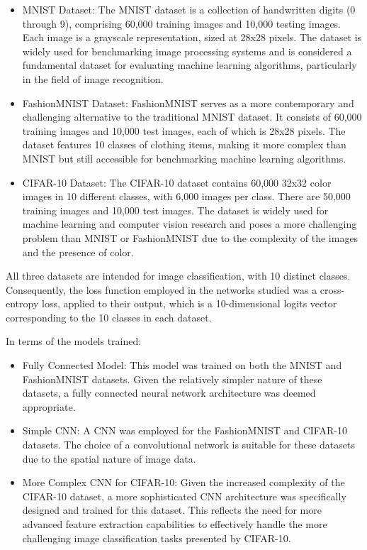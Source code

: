 \begin{itemize}

\item MNIST Dataset: The MNIST dataset is a collection of handwritten digits (0 through 9), comprising 60,000 training images and 10,000 testing images. Each image is a grayscale representation, sized at 28x28 pixels. The dataset is widely used for benchmarking image processing systems and is considered a fundamental dataset for evaluating machine learning algorithms, particularly in the field of image recognition.

\item FashionMNIST Dataset: FashionMNIST serves as a more contemporary and challenging alternative to the traditional MNIST dataset. It consists of 60,000 training images and 10,000 test images, each of which is 28x28 pixels. The dataset features 10 classes of clothing items, making it more complex than MNIST but still accessible for benchmarking machine learning algorithms.

\item CIFAR-10 Dataset: The CIFAR-10 dataset contains 60,000 32x32 color images in 10 different classes, with 6,000 images per class. There are 50,000 training images and 10,000 test images. The dataset is widely used for machine learning and computer vision research and poses a more challenging problem than MNIST or FashionMNIST due to the complexity of the images and the presence of color.

\end{itemize}

All three datasets are intended for image classification, with 10 distinct classes. Consequently, the loss function employed in the networks studied was a cross-entropy loss, applied to their output, which is a 10-dimensional logits vector corresponding to the 10 classes in each dataset.

In terms of the models trained:

\begin{itemize}

\item Fully Connected Model: This model was trained on both the MNIST and FashionMNIST datasets. Given the relatively simpler nature of these datasets, a fully connected neural network architecture was deemed appropriate.

\item Simple CNN: A CNN was employed for the FashionMNIST and CIFAR-10 datasets. The choice of a convolutional network is suitable for these datasets due to the spatial nature of image data.

\item More Complex CNN for CIFAR-10: Given the increased complexity of the CIFAR-10 dataset, a more sophisticated CNN architecture was specifically designed and trained for this dataset. This reflects the need for more advanced feature extraction capabilities to effectively handle the more challenging image classification tasks presented by CIFAR-10.

\end{itemize}

